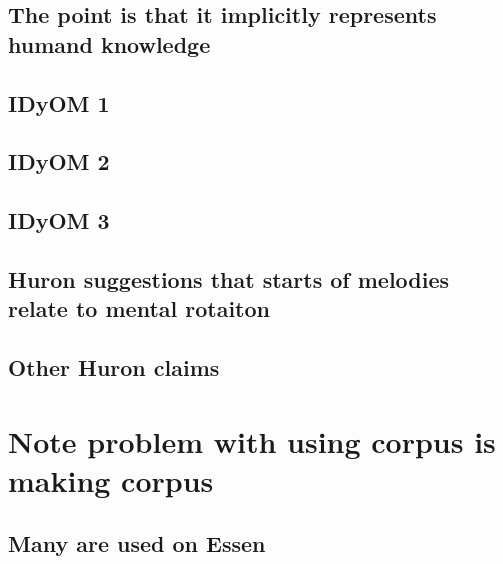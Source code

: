 \documentclass[]{book}
\begin{document}
\hypertarget{the-point-is-that-it-implicitly-represents-humand-knowledge}{%
\subsection{The point is that it implicitly represents humand knowledge}\label{the-point-is-that-it-implicitly-represents-humand-knowledge}}

\hypertarget{idyom-1}{%
\subsection{IDyOM 1}\label{idyom-1}}

\hypertarget{idyom-2}{%
\subsection{IDyOM 2}\label{idyom-2}}

\hypertarget{idyom-3}{%
\subsection{IDyOM 3}\label{idyom-3}}

\hypertarget{huron-suggestions-that-starts-of-melodies-relate-to-mental-rotaiton}{%
\subsection{Huron suggestions that starts of melodies relate to mental rotaiton}\label{huron-suggestions-that-starts-of-melodies-relate-to-mental-rotaiton}}

\hypertarget{other-huron-claims}{%
\subsection{Other Huron claims}\label{other-huron-claims}}

\hypertarget{note-problem-with-using-corpus-is-making-corpus}{%
\section{Note problem with using corpus is making corpus}\label{note-problem-with-using-corpus-is-making-corpus}}

\hypertarget{many-are-used-on-essen}{%
\subsection{Many are used on Essen}\label{many-are-used-on-essen}}
\end{document}

